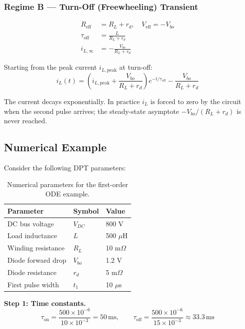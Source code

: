 \documentclass[11pt, a4paper]{article}
\begin{document}
\subsubsection{Regime B — Turn-Off (Freewheeling) Transient}

\begin{align*}
    R_{\text{eff}} &= R_L + r_d, \quad V_{\text{eff}} = -V_{bo}\\
    \tau_{\text{off}} &= \frac{L}{R_L + r_d}\\
    i_{L,\infty} &= -\frac{V_{bo}}{R_L + r_d}
\end{align*}

Starting from the peak current $i_{L,\text{peak}}$ at turn-off:
\[
    i_L(t) = \left(i_{L,\text{peak}} + \frac{V_{bo}}{R_L + r_d}\right)e^{-t/\tau_{\text{off}}} - \frac{V_{bo}}{R_L + r_d}
\]

The current decays exponentially. In practice $i_L$ is forced to zero by the circuit when the second pulse arrives; the steady-state asymptote $-V_{bo}/(R_L+r_d)$ is never reached.

\subsection{Numerical Example}

Consider the following DPT parameters:

\begin{table}[h]
\centering
\begin{tabular}{lll}
\toprule
\textbf{Parameter} & \textbf{Symbol} & \textbf{Value} \\
\midrule
DC bus voltage      & $V_{DC}$      & 800 V  \\
Load inductance     & $L$           & 500 $\mu$H \\
Winding resistance  & $R_L$         & 10 m$\Omega$ \\
Diode forward drop  & $V_{bo}$      & 1.2 V \\
Diode resistance    & $r_d$         & 5 m$\Omega$ \\
First pulse width   & $t_1$         & 10 $\mu$s \\
\bottomrule
\end{tabular}
\caption{Numerical parameters for the first-order ODE example.}
\label{tab:ode_params}
\end{table}

\textbf{Step 1: Time constants.}
\[
    \tau_{\text{on}} = \frac{500\times10^{-6}}{10\times10^{-3}} = 50\,\text{ms}, \qquad
    \tau_{\text{off}} = \frac{500\times10^{-6}}{15\times10^{-3}} \approx 33.3\,\text{ms}
\]
\end{document}
